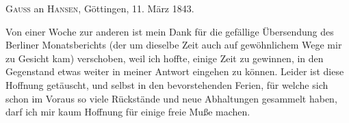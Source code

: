 \par{}\bigskip
\begin{center}
\textsc{Gauss} an \textsc{Hansen}, Göttingen, 11. März 1843.
\end{center}
\noindent\hspace*{\parindent}Von einer Woche zur anderen ist mein Dank für die gefällige Übersendung des Berliner Monatsberichts (der um dieselbe Zeit auch auf gewöhnlichem Wege mir zu Gesicht kam) verschoben, weil ich hoffte, einige Zeit zu gewinnen, in den Gegenstand etwas weiter in meiner Antwort eingehen zu können. Leider ist diese Hoffnung getäuscht, und selbst in den bevorstehenden Ferien, für welche sich schon im Voraus so viele Rückstände und neue Abhaltungen gesammelt haben, darf ich mir kaum Hoffnung für einige freie Muße machen.
